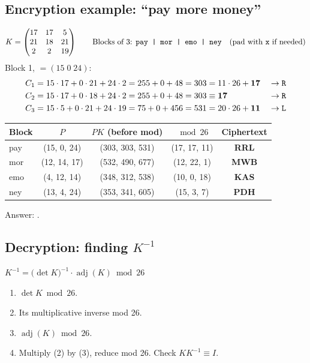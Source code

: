 \subsection{Encryption example: ``pay more money''}
\[
K = \begin{pmatrix}17&17&5\\21&18&21\\2&2&19\end{pmatrix}
\qquad\text{Blocks of 3: } \texttt{pay | mor | emo | ney} \quad\text{(pad with \texttt{x} if needed)}
\]
Block 1,  $= (15\;0\;24)$:
\[
\begin{aligned}
C_1 &= 15\cdot17 + 0\cdot21 + 24\cdot2 = 255+0+48 = 303 = 11\cdot26 + \mathbf{17} &&\to \texttt{R}\\
C_2 &= 15\cdot17 + 0\cdot18 + 24\cdot2 = 255+0+48 = 303 \equiv \mathbf{17} &&\to \texttt{R}\\
C_3 &= 15\cdot5 + 0\cdot21 + 24\cdot19 = 75+0+456 = 531 = 20\cdot26 + \mathbf{11} &&\to \texttt{L}
\end{aligned}
\]
\begin{center}\small
\begin{tabular}{@{}lcccc@{}}
\toprule
Block & $P$ & $PK$ (before mod) & $\bmod 26$ & Ciphertext\\
\midrule
pay & (15, 0, 24) & (303, 303, 531) & (17, 17, 11) & \textbf{RRL}\\
mor & (12, 14, 17) & (532, 490, 677) & (12, 22, 1) & \textbf{MWB}\\
emo & (4, 12, 14) & (348, 312, 538) & (10, 0, 18) & \textbf{KAS}\\
ney & (13, 4, 24) & (353, 341, 605) & (15, 3, 7) & \textbf{PDH}\\
\bottomrule
\end{tabular}
\end{center}
Answer: \textbf{}.

\subsection{Decryption: finding $K^{-1}$}
\begin{keybox}[title=Recipe]
$K^{-1} = \big(\det K\big)^{-1} \cdot \operatorname{adj}(K) \bmod 26$
\begin{enumerate}[leftmargin=1.5em]
  \item $\det K \bmod 26$.
  \item Its multiplicative inverse mod 26.
  \item $\operatorname{adj}(K) \bmod 26$.
  \item Multiply (2) by (3), reduce mod 26. Check $KK^{-1} \equiv I$.
\end{enumerate}
\end{keybox}

